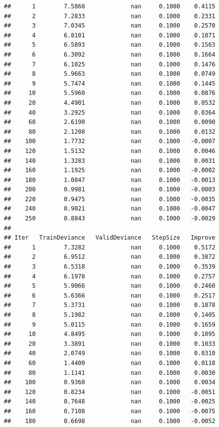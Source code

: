 \documentclass[
]{book}
\begin{document}
\begin{verbatim}
##      1        7.5868             nan     0.1000    0.4115
##      2        7.2833             nan     0.1000    0.2331
##      3        7.0345             nan     0.1000    0.2570
##      4        6.8101             nan     0.1000    0.1071
##      5        6.5893             nan     0.1000    0.1563
##      6        6.3092             nan     0.1000    0.1664
##      7        6.1025             nan     0.1000    0.1476
##      8        5.9663             nan     0.1000    0.0749
##      9        5.7474             nan     0.1000    0.1445
##     10        5.5960             nan     0.1000    0.0876
##     20        4.4901             nan     0.1000    0.0532
##     40        3.2925             nan     0.1000    0.0364
##     60        2.6190             nan     0.1000    0.0090
##     80        2.1208             nan     0.1000    0.0132
##    100        1.7732             nan     0.1000   -0.0007
##    120        1.5132             nan     0.1000    0.0046
##    140        1.3283             nan     0.1000    0.0031
##    160        1.1925             nan     0.1000   -0.0002
##    180        1.0847             nan     0.1000   -0.0013
##    200        0.9981             nan     0.1000   -0.0003
##    220        0.9475             nan     0.1000   -0.0035
##    240        0.9021             nan     0.1000   -0.0047
##    250        0.8843             nan     0.1000   -0.0029
## 
## Iter   TrainDeviance   ValidDeviance   StepSize   Improve
##      1        7.3282             nan     0.1000    0.5172
##      2        6.9512             nan     0.1000    0.3872
##      3        6.5318             nan     0.1000    0.3539
##      4        6.1978             nan     0.1000    0.2757
##      5        5.9066             nan     0.1000    0.2460
##      6        5.6366             nan     0.1000    0.2517
##      7        5.3731             nan     0.1000    0.1878
##      8        5.1982             nan     0.1000    0.1405
##      9        5.0115             nan     0.1000    0.1659
##     10        4.8495             nan     0.1000    0.1095
##     20        3.3891             nan     0.1000    0.1033
##     40        2.0749             nan     0.1000    0.0310
##     60        1.4400             nan     0.1000    0.0118
##     80        1.1141             nan     0.1000    0.0030
##    100        0.9360             nan     0.1000    0.0034
##    120        0.8234             nan     0.1000   -0.0051
##    140        0.7648             nan     0.1000   -0.0025
##    160        0.7108             nan     0.1000   -0.0075
##    180        0.6698             nan     0.1000   -0.0052

\end{verbatim}
\end{document}
